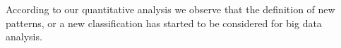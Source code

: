 According to our quantitative analysis we observe that the definition of new
patterns, or a new classification has started to be considered for big data
analysis. 




% 
% 
